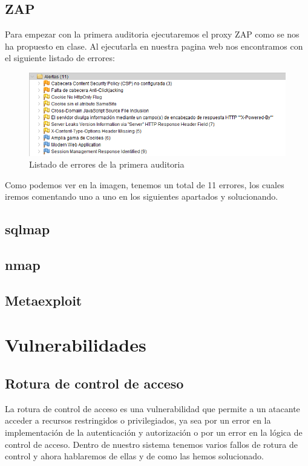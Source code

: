 \documentclass{report}
\begin{document}
        \section{ZAP}
        Para empezar con la primera auditoria ejecutaremos el proxy ZAP como se nos ha propuesto en clase.
        Al ejecutarla en nuestra pagina web nos encontramos con el siguiente listado de errores:
        \begin{figure}[H]
            \centering
            \includegraphics[width=\textwidth]{./img/audit1/zap1.png}
            \caption{Listado de errores de la primera auditoria}
        \end{figure}
        Como podemos ver en la imagen, tenemos un total de 11 errores, los cuales iremos comentando uno a uno en los siguientes apartados y solucionando.
        \section{sqlmap}
        \section{nmap}
        \section{Metaexploit}
    \chapter{Vulnerabilidades}
        \section{Rotura de control de acceso}
            La rotura de control de acceso es una vulnerabilidad que permite a un atacante acceder a recursos restringidos o privilegiados, ya sea por un error en la implementación de la autenticación y autorización o por un error en la lógica de control de acceso.
            Dentro de nuestro sistema tenemos varios fallos de rotura de control y ahora hablaremos de ellas y de como las hemos solucionado.
\end{document}
